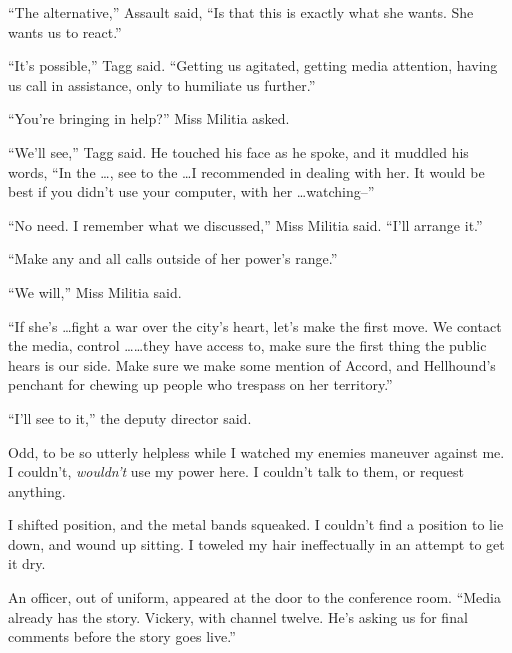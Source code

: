 ``The alternative,'' Assault said, ``Is that this is exactly what she wants.  She wants us to react.''



``It's possible,'' Tagg said.  ``Getting us agitated, getting media attention, having us call in assistance, only to humiliate us further.''



``You're bringing in help?'' Miss Militia asked.



``We'll see,'' Tagg said.  He touched his face as he spoke, and it muddled his words, ``In the \ldots, see to the \ldots I recommended in dealing with her.  It would be best if you didn't use your computer, with her \ldots watching--''



``No need.  I remember what we discussed,'' Miss Militia said.  ``I'll arrange it.''



``Make any and all calls outside of her power's range.''



``We will,'' Miss Militia said.



``If she's \ldots fight a war over the city's heart, let's make the first move.  We contact the media, control \ldots \ldots they have access to, make sure the first thing the public hears is our side.  Make sure we make some mention of Accord, and Hellhound's penchant for chewing up people who trespass on her territory.''



``I'll see to it,'' the deputy director said.



Odd, to be so utterly helpless while I watched my enemies maneuver against me.  I couldn't, \emph{wouldn't} use my power here.  I couldn't talk to them, or request anything.



I shifted position, and the metal bands squeaked.  I couldn't find a position to lie down, and wound up sitting.  I toweled my hair ineffectually in an attempt to get it dry.



An officer, out of uniform, appeared at the door to the conference room.  ``Media already has the story.  Vickery, with channel twelve.  He's asking us for final comments before the story goes live.''




